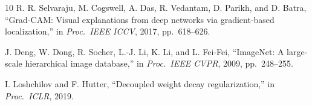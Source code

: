 \documentclass[conference]{IEEEtran}
\begin{document}
\begin{thebibliography}{10}
R. R. Selvaraju, M. Cogswell, A. Das, R. Vedantam, D. Parikh, and D. Batra, ``Grad-CAM: Visual explanations from deep networks via gradient-based localization,'' in \emph{Proc.\ IEEE ICCV}, 2017, pp.~618--626.

J. Deng, W. Dong, R. Socher, L.-J. Li, K. Li, and L. Fei-Fei, ``ImageNet: A large-scale hierarchical image database,'' in \emph{Proc.\ IEEE CVPR}, 2009, pp.~248--255.

I. Loshchilov and F. Hutter, ``Decoupled weight decay regularization,'' in \emph{Proc.\ ICLR}, 2019.

\end{thebibliography}
\end{document}
